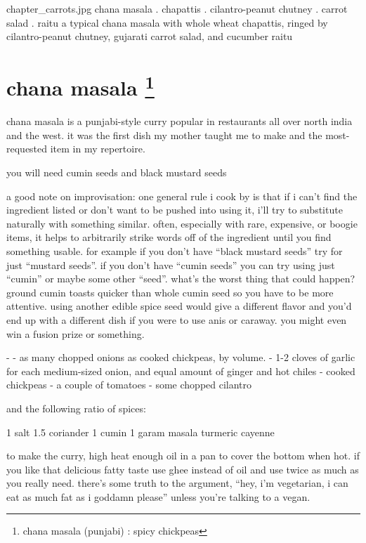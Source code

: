 \mychapter
{chapter_carrots.jpg}
{chana masala . chapattis . cilantro-peanut chutney . carrot salad . raitu}
{a typical chana masala with whole wheat chapattis,
ringed by cilantro-peanut chutney, gujarati carrot salad, and cucumber
raitu}

\section{chana masala
\footnote{chana masala (punjabi) : spicy chickpeas}}

chana masala is a punjabi-style curry popular in restaurants all over north india and the west. it was the first dish my mother taught me to make and the most-requested item in my repertoire.

you will need
	cumin seeds and black mustard seeds

a good note on improvisation:
	one general rule i cook by is that if i can't find the ingredient listed or don't want to be pushed into using it, i'll try to substitute naturally with something similar. often, especially with rare, expensive, or boogie items, it helps to arbitrarily strike words off of the ingredient until you find something usable.
	for example if you don't have ``black mustard seeds'' try for just ``mustard seeds''. if you don't have ``cumin seeds'' you can try using just ``cumin'' or maybe some other ``seed''. what's the worst thing that could happen? ground cumin toasts quicker than whole cumin seed so you have to be more attentive. using another edible spice seed would give a different flavor and you'd end up with a different dish if you were to use anis or caraway. you might even win a fusion prize or something. 

	-	\onethird - \onehalf as many chopped onions as cooked chickpeas, by volume.
	-	1-2 cloves of garlic for each medium-sized onion, and equal amount of ginger and hot chiles
	-	cooked chickpeas
	-	a couple of tomatoes
	-	some chopped cilantro

and the following ratio of spices:

	1	salt
	1.5	coriander
	1	cumin
	1	garam masala
	\onequarter	turmeric
	\onehalf	cayenne

to make the curry, high heat enough oil in a pan to cover the bottom when hot. if you like that delicious fatty taste use ghee instead of oil and use twice as much as you really need. there's some truth to the argument, ``hey, i'm vegetarian, i can eat as much fat as i goddamn please'' unless you're talking to a vegan.

